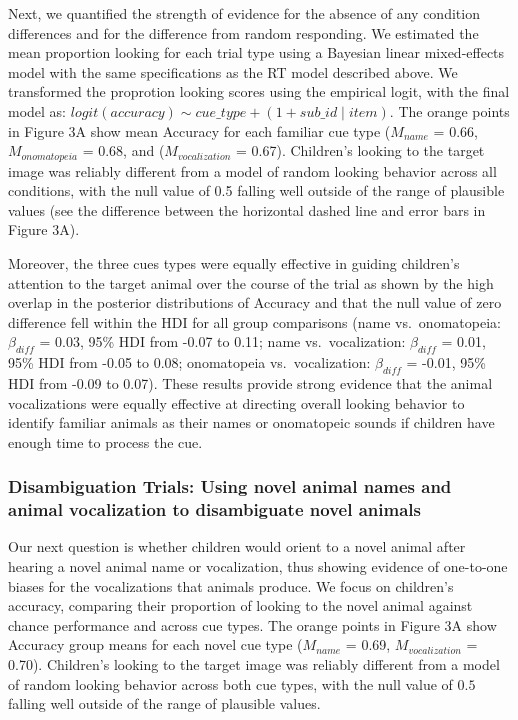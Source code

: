 \documentclass[english,floatsintext,man]{apa6}
\theoremstyle{definition}
\theoremstyle{definition}
\theoremstyle{definition}
\theoremstyle{remark}
\begin{document}
Next, we quantified the strength of evidence for the absence of any
condition differences and for the difference from random responding. We
estimated the mean proportion looking for each trial type using a
Bayesian linear mixed-effects model with the same specifications as the
RT model described above. We transformed the proprotion looking scores
using the empirical logit, with the final model as:
\(logit(accuracy) \sim cue\_type + (1 + sub\_id \mid item)\). The orange
points in Figure 3A show mean Accuracy for each familiar cue type
(\(M_{name}\) = 0.66, \(M_{onomatopeia}\) = 0.68, and
(\(M_{vocalization}\) = 0.67). Children's looking to the target image
was reliably different from a model of random looking behavior across
all conditions, with the null value of 0.5 falling well outside of the
range of plausible values (see the difference between the horizontal
dashed line and error bars in Figure 3A).

Moreover, the three cues types were equally effective in guiding
children's attention to the target animal over the course of the trial
as shown by the high overlap in the posterior distributions of Accuracy
and that the null value of zero difference fell within the HDI for all
group comparisons (name vs.~onomatopeia: \(\beta_{diff}\) = 0.03, 95\%
HDI from -0.07 to 0.11; name vs.~vocalization: \(\beta_{diff}\) = 0.01,
95\% HDI from -0.05 to 0.08; onomatopeia vs.~vocalization:
\(\beta_{diff}\) = -0.01, 95\% HDI from -0.09 to 0.07). These results
provide strong evidence that the animal vocalizations were equally
effective at directing overall looking behavior to identify familiar
animals as their names or onomatopeic sounds if children have enough
time to process the cue.

\hypertarget{disambiguation-trials-using-novel-animal-names-and-animal-vocalization-to-disambiguate-novel-animals}{%
\subsubsection{Disambiguation Trials: Using novel animal names and
animal vocalization to disambiguate novel
animals}\label{disambiguation-trials-using-novel-animal-names-and-animal-vocalization-to-disambiguate-novel-animals}}

Our next question is whether children would orient to a novel animal
after hearing a novel animal name or vocalization, thus showing evidence
of one-to-one biases for the vocalizations that animals produce. We
focus on children's accuracy, comparing their proportion of looking to
the novel animal against chance performance and across cue types. The
orange points in Figure 3A show Accuracy group means for each novel cue
type (\(M_{name}\) = 0.69, \(M_{vocalization}\) = 0.70). Children's
looking to the target image was reliably different from a model of
random looking behavior across both cue types, with the null value of
\(0.5\) falling well outside of the range of plausible values.
\end{document}
